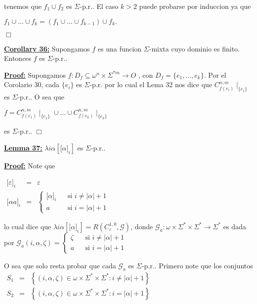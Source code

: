   tenemos que \(f_{1}\cup f_{2}\) es \(\Sigma \)-p.r..
  El caso \(k >2\) puede probarse por induccion ya que

  \(\displaystyle f_{1}\cup ...\cup f_{k}=(f_{1}\cup ...\cup f_{k-1})\cup f_{k}. \)

  \(\Box\)


  \textbf{\underline{Corollary 36:}} Supongamos \(f\) es una funcion \(\Sigma \)-mixta cuyo dominio es finito. Entonces \(f\) es \(\Sigma \)-p.r..

  \textbf{\underline{Proof:}} Supongamos \(f:D_{f}\subseteq \omega ^{n}\times \Sigma ^{\ast m}\rightarrow O\) , con \(D_{f}=\{e_{1},...,e_{k}\}\). Por el Corolario 30, cada \( \{e_{i}\}\) es \(\Sigma \)-p.r. por lo cual el Lema 32 nos dice que \(C_{f(e_{i})}^{n,m}\mid _{\{e_{1}\}}\) es \(\Sigma \)-p.r.. O sea que

  \(\displaystyle f=C_{f(e_{1})}^{n,m}\mid _{\{e_{1}\}}\cup ...\cup C_{f(e_{k})}^{n,m}\mid _{\{e_{k}\}} \)

  es \(\Sigma \)-p.r.. \(\Box\)


  \textbf{\underline{Lemma 37:}} \(\lambda i\alpha \left[ \lbrack \alpha ]_{i}\right] \) es \(\Sigma \)-p.r..

  \textbf{\underline{Proof:}} Note que

  \(\displaystyle \begin{array}{rcl} \lbrack \varepsilon ]_{i} & =& \varepsilon \\ \lbrack \alpha a]_{i} & =& \left\{ \begin{array}{lll} \lbrack \alpha ]_{i} & & \text{si }i\neq \left\vert \alpha \right\vert +1 \\ a & & \text{si }i=\left\vert \alpha \right\vert +1 \end{array} \right. \end{array} \)

  lo cual dice que \(\lambda i\alpha \left[ \lbrack \alpha ]_{i}\right] =R\left( C_{\varepsilon }^{1,0},\mathcal{G}\right) \), donde \(\mathcal{G} _{a}:\omega \times \Sigma ^{\ast }\times \Sigma ^{\ast }\rightarrow \Sigma ^{\ast }\) es dada por
  \(\displaystyle \mathcal{G}_{a}(i,\alpha ,\zeta )=\left\{ \begin{array}{lll} \zeta & & \text{si }i\neq \left\vert \alpha \right\vert +1 \\ a & & \text{si }i=\left\vert \alpha \right\vert +1 \end{array} \right. \)

  O sea que solo resta probar que cada \(\mathcal{G}_{a}\) es \(\Sigma \)-p.r.. Primero note que los conjuntos
  \(\displaystyle \begin{array}{rcl} S_{1} & =& \left\{ (i,\alpha ,\zeta )\in \omega \times \Sigma ^{\ast }\times \Sigma ^{\ast }:i\neq \left\vert \alpha \right\vert +1\right\} \\ S_{2} & =& \left\{ (i,\alpha ,\zeta )\in \omega \times \Sigma ^{\ast }\times \Sigma ^{\ast }:i=\left\vert \alpha \right\vert +1\right\} \end{array} \)

